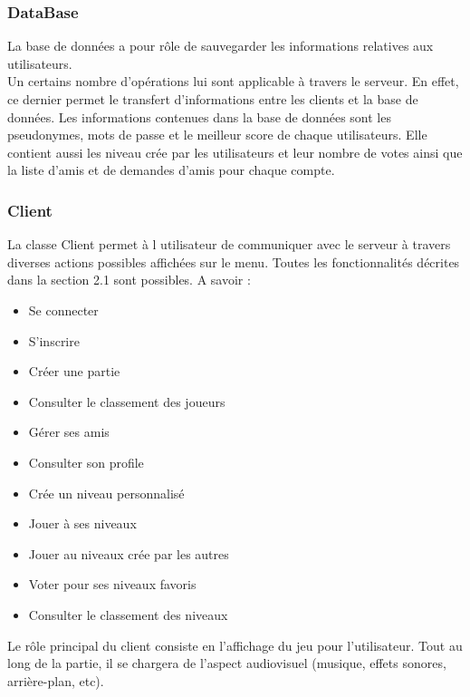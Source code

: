 \documentclass[a4paper,12pt]{article}
\begin{document}
\subsubsection{DataBase}

La base de données a pour rôle de sauvegarder les informations relatives aux utilisateurs. \\
Un certains nombre d'opérations lui sont applicable à travers le serveur. En effet, ce dernier permet le transfert d'informations entre les clients et la base de données. 
Les informations contenues dans la base de données sont les pseudonymes, mots de passe et le meilleur score de chaque utilisateurs. Elle contient aussi les niveau crée par les utilisateurs et leur nombre de votes ainsi que la liste d'amis et de demandes d'amis pour chaque compte. 

\subsubsection{Client}
La classe Client permet à l utilisateur de communiquer avec le serveur à travers diverses actions possibles affichées sur le menu.
Toutes les fonctionnalités décrites dans la section 2.1 sont possibles. A savoir : 
\begin{itemize}
    \item Se connecter
    \item S'inscrire
    \item Créer une partie
    \item Consulter le classement des joueurs
    \item Gérer ses amis
    \item Consulter son profile
    \item Crée un niveau personnalisé
    \item Jouer à ses niveaux
    \item Jouer au niveaux crée par les autres
    \item Voter pour ses niveaux favoris
    \item Consulter le classement des niveaux\\
\end{itemize}
Le rôle principal du client consiste en l'affichage du jeu pour l'utilisateur. Tout au long de la partie, il se chargera de l'aspect audiovisuel (musique, effets sonores, arrière-plan, etc). 
\end{document}
